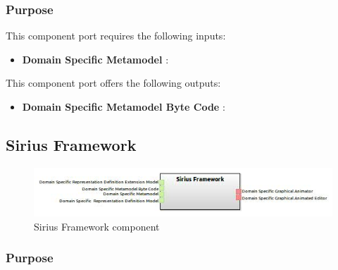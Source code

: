 \documentclass{gemoc} %
\begin{document}
\subsubsection{Purpose}

This component port requires the following inputs:
\begin{itemize}
  \item \textbf{Domain Specific Metamodel} :
\end{itemize}

This component port offers the following outputs:
\begin{itemize}
  \item \textbf{Domain Specific Metamodel Byte Code} :
\end{itemize}

\subsection{Sirius Framework}

\begin{figure}[htp]
	\begin{center}
	\includegraphics*[trim=0.0cm 0.0cm 0cm 0.0cm, clip=true, scale=1.0]{../images/generated/Generated_Sirius Framework.jpg}
	\caption{Sirius Framework component}
	\end{center}
\end{figure}

\subsubsection{Purpose}
\end{document}
